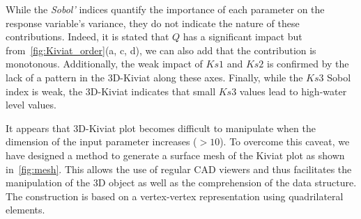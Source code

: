 While the \emph{Sobol'} indices quantify the importance of each parameter on the response variable's variance, they do not indicate the nature of these contributions. Indeed, it is stated that $Q$ has a significant impact but from~\cref{fig:Kiviat_order}(a, c, d), we can also add that the contribution is monotonous. Additionally, the weak impact of $Ks1$ and $Ks2$ is confirmed by the lack of a pattern in the 3D-Kiviat along these axes. Finally, while the $Ks3$ Sobol index is weak, the 3D-Kiviat indicates that small $Ks3$ values lead to high-water level values.

It appears that 3D-Kiviat plot becomes difficult to manipulate when the dimension of the input parameter increases ($>10$). To overcome this caveat, we have designed a method to generate a surface mesh of the Kiviat plot as shown in~\cref{fig:mesh}. This allows the use of regular CAD viewers and thus facilitates the manipulation of the 3D object as well as the comprehension of the data structure. The construction is based on a vertex-vertex representation using quadrilateral elements. %



